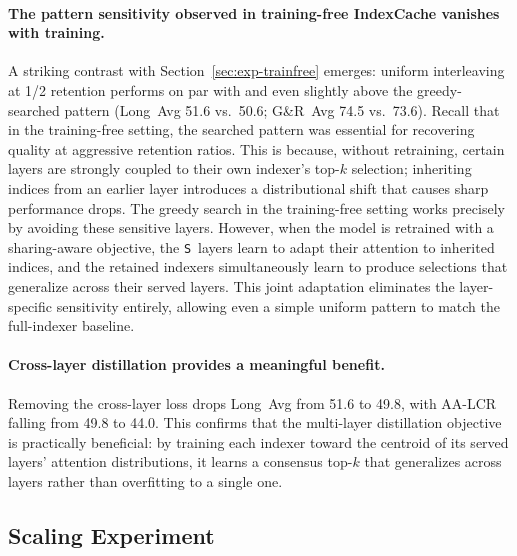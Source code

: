 \paragraph{The pattern sensitivity observed in training-free IndexCache vanishes with training.}
A striking contrast with Section~\ref{sec:exp-trainfree} emerges: uniform interleaving at 1/2 retention performs on par with and even slightly above the greedy-searched pattern (Long~Avg 51.6 vs.\ 50.6; G\&R~Avg 74.5 vs.\ 73.6).
Recall that in the training-free setting, the searched pattern was essential for recovering quality at aggressive retention ratios.
This is because, without retraining, certain layers are strongly coupled to their own indexer's top-$k$ selection; inheriting indices from an earlier layer introduces a distributional shift that causes sharp performance drops.
The greedy search in the training-free setting works precisely by avoiding these sensitive layers.
However, when the model is retrained with a sharing-aware objective, the \texttt{S}~layers learn to adapt their attention to inherited indices, and the retained indexers simultaneously learn to produce selections that generalize across their served layers.
This joint adaptation eliminates the layer-specific sensitivity entirely, allowing even a simple uniform pattern to match the full-indexer baseline.

\paragraph{Cross-layer distillation provides a meaningful benefit.}
Removing the cross-layer loss drops Long~Avg from 51.6 to 49.8, with AA-LCR falling from 49.8 to 44.0.
This confirms that the multi-layer distillation objective is practically beneficial: by training each indexer toward the centroid of its served layers' attention distributions, it learns a consensus top-$k$ that generalizes across layers rather than overfitting to a single one.

\subsection{Scaling Experiment}
\label{sec:scales}


